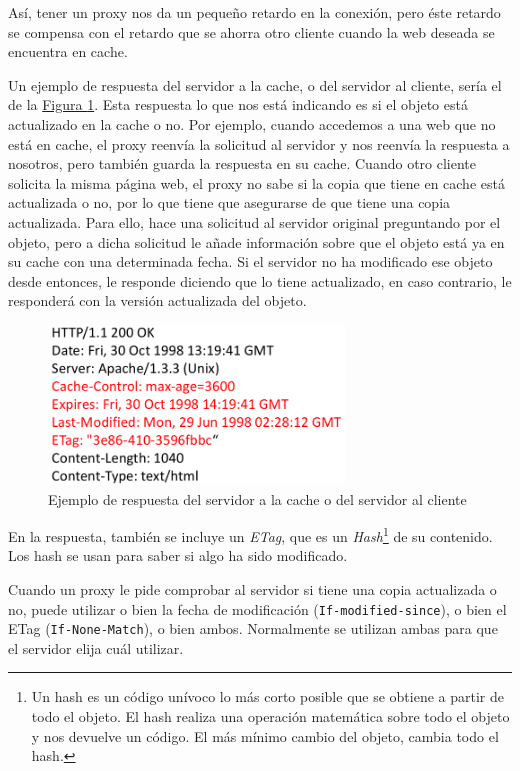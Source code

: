 \documentclass[10pt,a4paper,spanish]{report}
\begin{document}
Así, tener un proxy nos da un pequeño retardo en la conexión, pero éste retardo se compensa con el retardo que se ahorra otro cliente cuando la web deseada se encuentra en cache.

Un ejemplo de respuesta del servidor a la cache, o del servidor al cliente, sería el de la \hyperref[ejrespuesta]{Figura \ref*{ejrespuesta}}. Esta respuesta lo que nos está indicando es si el objeto está actualizado en la cache o no. Por ejemplo, cuando accedemos a una web que no está en cache, el proxy reenvía la solicitud al servidor y nos reenvía la respuesta a nosotros, pero también guarda la respuesta en su cache. Cuando otro cliente solicita la misma página web, el proxy no sabe si la copia que tiene en cache está actualizada o no, por lo que tiene que asegurarse de que tiene una copia actualizada. Para ello, hace una solicitud al servidor original preguntando por el objeto, pero a dicha solicitud le añade información sobre que el objeto está ya en su cache con una determinada fecha. Si el servidor no ha modificado ese objeto desde entonces, le responde diciendo que lo tiene actualizado, en caso contrario, le responderá con la versión actualizada del objeto.

\begin{figure}[!h]
\centering
\includegraphics[width=0.7\textwidth]{tema2_8}
\caption{Ejemplo de respuesta del servidor a la cache o del servidor al cliente}
\label{ejrespuesta}
\end{figure}

En la respuesta, también se incluye un \textcolor{tema2}{\textit{ETag}}, que es un \textcolor{tema2}{\textit{Hash}}\footnote{Un hash es un código unívoco lo más corto posible que se obtiene a partir de todo el objeto. El hash realiza una operación matemática sobre todo el objeto y nos devuelve un código. El más mínimo cambio del objeto, cambia todo el hash.} de su contenido. Los hash se usan para saber si algo ha sido modificado.

Cuando un proxy le pide comprobar al servidor si tiene una copia actualizada o no, puede utilizar o bien la fecha de modificación (\texttt{If-modified-since}), o bien el ETag (\texttt{If-None-Match}), o bien ambos. Normalmente se utilizan ambas para que el servidor elija cuál utilizar.
\end{document}
